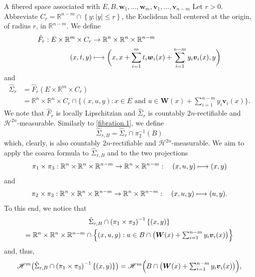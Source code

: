 \documentclass[JEP,XML,SOM,Unicode,ThmDefs,NoEqCountersInSection]{cedram}
\newcommand\mto{\mathchoice{\longmapsto}{\mapsto}{\mapsto}{\mapsto}}
\newenvironment{Empty}[2][\null]{%
\begin{enonce}[remark]{#1}#2}
{\end{enonce}}
\newcommand{\R}{\mathbb{R}}
\newcommand{\Rm}{\R^m}
\newcommand{\Rn}{\R^n}
\newcommand{\calH}{\mathscr{H}}
\newcommand{\bW}{{\boldsymbol{W}}}
\newcommand{\bv}{{\boldsymbol{v}}}
\newcommand{\bw}{{\boldsymbol{w}}}
\begin{document}
\begin{Empty}[A fibered space associated with $E, B, \bw_1,\ldots,\bw_m,\bv_1,\ldots,\bv_{n-m}$]
\label{fibration.2}
Let $r > 0$.
Abbreviate $C_r = \R^{n-m} \cap \left\{ y: |y| \leq r \right\}$, the Euclidean ball centered at the origin, of radius $r$, in $\R^{n-m}$.
We define
\begin{align*}
\hat{F}_r: E \times \Rm \times C_r &\to \Rn \times \Rn \times \R^{n-m}\\
(x,t,y) &\mto \biggl(x, x + \sum_{i=1}^m t_i \bw_i(x) + \sum_{i=1}^{n-m} y_i \bv_i(x), y \biggr)
\end{align*}
and
\begin{align*}
\hat{\Sigma}_r &= \hat{F}_r \left(E \times \Rm \times C_r \right)\\
&= \Rn \times \Rn \times C_r \cap \textstyle\bigl\{ (x,u,y): x \in E \text{ and } u \in \bW(x) + \sum_{i=1}^{n-m} y_i\bv_i(x)\bigr\}.
\end{align*}
We note that $\hat{F}_r$ is locally Lipschitzian and $\hat{\Sigma}_r$ is countably $2n$-rectifiable and $\calH^{2n}$\nobreakdash-measurable.
Similarly to \ref{fibration.1}, we define
\begin{equation*}
\hat{\Sigma}_{r,B} = \hat{\Sigma}_r \cap \pi_2^{-1}(B)
\end{equation*}
which, clearly, is also countably $2n$-rectifiable and $\calH^{2n}$-measurable.
We aim to apply the coarea formula to $\hat{\Sigma}_{r,B}$ and to the two projections
\begin{equation*}
\pi_1 \times \pi_3: \Rn \times \Rn \times \R^{n-m} \to \Rn \times \R^{n-m}:\quad (x,u,y) \mto (x,y)
\end{equation*}
and
\begin{equation*}
\pi_2 \times \pi_3: \Rn \times \Rn \times \R^{n-m} \to \Rn \times \R^{n-m}:\quad (x,u,y) \mto (u,y).
\end{equation*}
To this end, we notice that
\begin{multline*}
\hat{\Sigma}_{r,B} \cap \left(\pi_1 \times \pi_3 \right)^{-1} \{ (x,y) \} \\ = \textstyle\Rn \times \Rn \times \R^{n-m} \cap \Bigl\{ (x,u,y): u \in B \cap \bigl(\bW(x) + \sum_{i=1}^{n-m} y_i \bv_i(x) \bigr)\Bigr\}
\end{multline*}
and, thus,
\begin{equation*}
\calH^m \bigl(\hat{\Sigma}_{r,B} \cap \left(\pi_1 \times \pi_3 \right)^{-1} \{ (x,y) \}\bigr) = \textstyle\calH^m \Bigl(B \cap \bigl(\bW(x) + \sum_{i=1}^{n-m} y_i \bv_i(x) \bigr) \Bigr),
\end{equation*}

\end{Empty}
\end{document}
